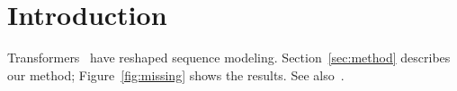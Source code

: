 \section{Introduction}\label{sec:intro}
Transformers~\cite{vaswani2017attention} have reshaped sequence modeling.
Section~\ref{sec:method} describes our method; Figure~\ref{fig:missing} shows the results. %
See also~\cite{nobody2099}. %
